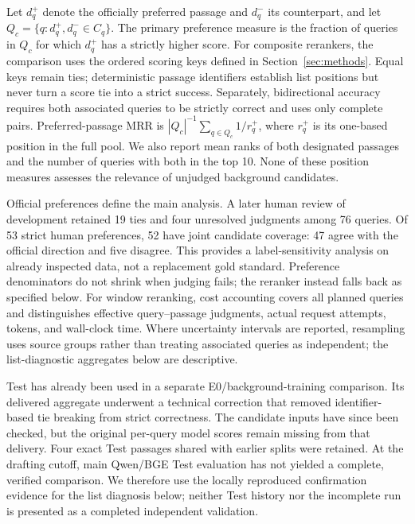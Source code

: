Let $d_q^+$ denote the officially preferred passage and $d_q^-$ its counterpart, and let $Q_c=\{q:d_q^+,d_q^-\in C_q\}$. The primary preference measure is the fraction of queries in $Q_c$ for which $d_q^+$ has a strictly higher score. For composite rerankers, the comparison uses the ordered scoring keys defined in Section~\ref{sec:methods}. Equal keys remain ties; deterministic passage identifiers establish list positions but never turn a score tie into a strict success. Separately, bidirectional accuracy requires both associated queries to be strictly correct and uses only complete pairs. Preferred-passage MRR is $|Q_c|^{-1}\sum_{q\in Q_c}1/r_q^+$, where $r_q^+$ is its one-based position in the full pool. We also report mean ranks of both designated passages and the number of queries with both in the top 10. None of these position measures assesses the relevance of unjudged background candidates.

Official preferences define the main analysis. A later human review of development retained 19 ties and four unresolved judgments among 76 queries. Of 53 strict human preferences, 52 have joint candidate coverage: 47 agree with the official direction and five disagree. This provides a label-sensitivity analysis on already inspected data, not a replacement gold standard. Preference denominators do not shrink when judging fails; the reranker instead falls back as specified below. For window reranking, cost accounting covers all planned queries and distinguishes effective query--passage judgments, actual request attempts, tokens, and wall-clock time. Where uncertainty intervals are reported, resampling uses source groups rather than treating associated queries as independent; the list-diagnostic aggregates below are descriptive.

Test has already been used in a separate E0/background-training comparison. Its delivered aggregate underwent a technical correction that removed identifier-based tie breaking from strict correctness. The candidate inputs have since been checked, but the original per-query model scores remain missing from that delivery. Four exact Test passages shared with earlier splits were retained. At the drafting cutoff, main Qwen/BGE Test evaluation has not yielded a complete, verified comparison. We therefore use the locally reproduced confirmation evidence for the list diagnosis below; neither Test history nor the incomplete run is presented as a completed independent validation.
